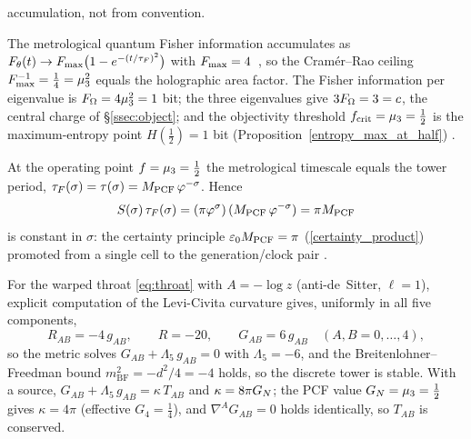 \begin{remark}
accumulation, not from convention.
\end{remark}\begin{proposition}\label{prop:obs-accum}
The metrological quantum Fisher information accumulates as
$F_\theta(t)\to F_{\max}\bigl(1-e^{-(t/\tau_{F})^{2}}\bigr)$ with $F_{\max}=4$~\cite{Kiely26},
so the Cram\'er--Rao ceiling $F_{\max}^{-1}=\tfrac14=\mu_{3}^{2}$ equals the
holographic area factor. The Fisher information per eigenvalue is
$F_{\Omega}=4\mu_{3}^{2}=1$ bit; the three eigenvalues give $3F_{\Omega}=3=c$, the
central charge of \S\ref{ssec:object}; and the objectivity threshold
$f_{\mathrm{crit}}=\mu_{3}=\tfrac12$ is the maximum-entropy point $H(\tfrac12)=1$ bit
(Proposition~\ref{entropy_max_at_half}) .

\end{proposition}

\begin{theorem}\label{thm:obs-weld}
At the operating point $f=\mu_{3}=\tfrac12$ the metrological timescale equals the
tower period, $\tau_{F}(\sigma)=\tau(\sigma)=M_{\mathrm{PCF}}\,\varphi^{-\sigma}$. Hence
\[
S(\sigma)\,\tau_{F}(\sigma)=(\pi\varphi^{\sigma})\,(M_{\mathrm{PCF}}\,\varphi^{-\sigma})=\pi M_{\mathrm{PCF}}
\]
is constant in $\sigma$: the certainty principle $\varepsilon_{0}M_{\mathrm{PCF}}=\pi$
(\eqref{certainty_product}) promoted from a single cell to the generation/clock pair .
\end{theorem}\begin{proposition}\label{prop:obs-einstein}
For the warped throat \eqref{eq:throat} with $A=-\log z$ (anti-de~Sitter,
$\ell=1$), explicit computation of the Levi-Civita curvature gives, uniformly in
all five components,
\[
R_{AB}=-4\,g_{AB},\qquad R=-20,\qquad G_{AB}=6\,g_{AB}\quad(A,B=0,\dots,4),
\]
so the metric solves $G_{AB}+\Lambda_5\,g_{AB}=0$ with $\Lambda_5=-6$, and the
Breitenlohner--Freedman bound $m^{2}_{\mathrm{BF}}=-d^{2}/4=-4$ holds, so the discrete tower is
stable. With a
source, $G_{AB}+\Lambda_5\,g_{AB}=\kappa\,T_{AB}$ and $\kappa=8\pi G_{N}$; the PCF
value $G_{N}=\mu_{3}=\tfrac12$ gives $\kappa=4\pi$ (effective $G_4=\tfrac14$), and
$\nabla^{A}G_{AB}=0$ holds identically, so $T_{AB}$ is conserved.

\end{proposition}


